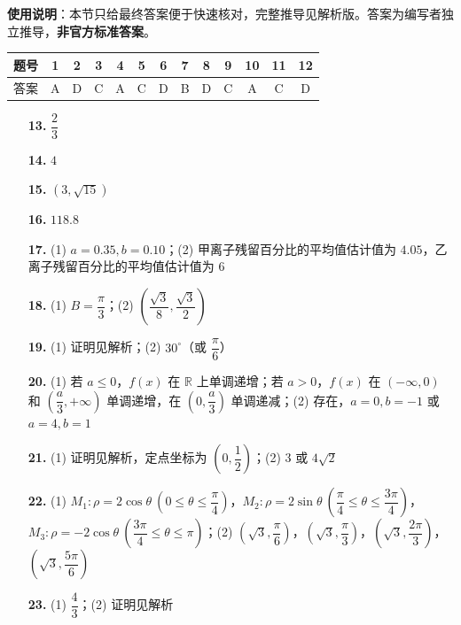 
\begin{gknotice}
\textbf{使用说明}：本节只给最终答案便于快速核对，完整推导见解析版。答案为编写者独立推导，\textbf{非官方标准答案}。
\end{gknotice}

\begin{center}\begin{tabular}{ccccccccccccc}
\toprule
题号 & 1 & 2 & 3 & 4 & 5 & 6 & 7 & 8 & 9 & 10 & 11 & 12 \\
\midrule
答案 & A & D & C & A & C & D & B & D & C & A & C & D \\
\bottomrule
\end{tabular}\end{center}

\begin{itemize}[leftmargin=2.6em]
  \item[\textbf{13.}] $\dfrac{2}{3}$
  \item[\textbf{14.}] $4$
  \item[\textbf{15.}] $(3, \sqrt{15})$
  \item[\textbf{16.}] $118.8$
\end{itemize}

\begin{itemize}[leftmargin=2.6em]
  \item[\textbf{17.}] (1) $a = 0.35, b = 0.10$；(2) 甲离子残留百分比的平均值估计值为 $4.05$，乙离子残留百分比的平均值估计值为 $6$
  \item[\textbf{18.}] (1) $B = \dfrac{\pi}{3}$；(2) $\left(\dfrac{\sqrt{3}}{8}, \dfrac{\sqrt{3}}{2}\right)$
  \item[\textbf{19.}] (1) 证明见解析；(2) $30^\circ$（或 $\dfrac{\pi}{6}$）
  \item[\textbf{20.}] (1) 若 $a \leqslant 0$，$f(x)$ 在 $\mathbb{R}$ 上单调递增；若 $a > 0$，$f(x)$ 在 $(-\infty, 0)$ 和 $\left(\dfrac{a}{3}, +\infty\right)$ 单调递增，在 $\left(0, \dfrac{a}{3}\right)$ 单调递减；(2) 存在，$a = 0, b = -1$ 或 $a = 4, b = 1$
  \item[\textbf{21.}] (1) 证明见解析，定点坐标为 $\left(0, \dfrac{1}{2}\right)$；(2) $3$ 或 $4\sqrt{2}$
\end{itemize}

\begin{itemize}[leftmargin=2.6em]
  \item[\textbf{22.}] (1) $M_1: \rho = 2\cos\theta\ (0 \leqslant \theta \leqslant \dfrac{\pi}{4})$，$M_2: \rho = 2\sin\theta\ (\dfrac{\pi}{4} \leqslant \theta \leqslant \dfrac{3\pi}{4})$，$M_3: \rho = -2\cos\theta\ (\dfrac{3\pi}{4} \leqslant \theta \leqslant \pi)$；(2) $\left(\sqrt{3}, \dfrac{\pi}{6}\right)$，$\left(\sqrt{3}, \dfrac{\pi}{3}\right)$，$\left(\sqrt{3}, \dfrac{2\pi}{3}\right)$，$\left(\sqrt{3}, \dfrac{5\pi}{6}\right)$
  \item[\textbf{23.}] (1) $\dfrac{4}{3}$；(2) 证明见解析
\end{itemize}
